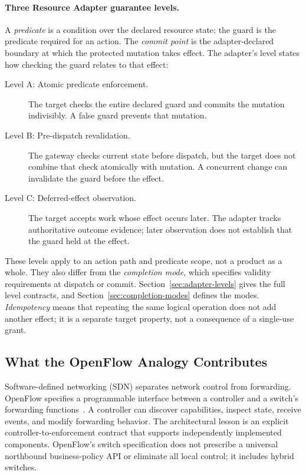 \paragraph{Three Resource Adapter guarantee levels.}
\label{sec:adapter-levels-overview}
A \emph{predicate} is a condition over the declared resource state; the guard is the predicate required for an action. The \emph{commit point} is the adapter-declared boundary at which the protected mutation takes effect. The adapter's level states how checking the guard relates to that effect:
\begin{description}
\item[Level A: Atomic predicate enforcement.] The target checks the entire declared guard and commits the mutation indivisibly. A false guard prevents that mutation.
\item[Level B: Pre-dispatch revalidation.] The gateway checks current state before dispatch, but the target does not combine that check atomically with mutation. A concurrent change can invalidate the guard before the effect.
\item[Level C: Deferred-effect observation.] The target accepts work whose effect occurs later. The adapter tracks authoritative outcome evidence; later observation does not establish that the guard held at the effect.
\end{description}
These levels apply to an action path and predicate scope, not a product as a whole. They also differ from the \emph{completion mode}, which specifies validity requirements at dispatch or commit. Section~\ref{sec:adapter-levels} gives the full level contracts, and Section~\ref{sec:completion-modes} defines the modes. \emph{Idempotency} means that repeating the same logical operation does not add another effect; it is a separate target property, not a consequence of a single-use grant.

\subsection{What the OpenFlow Analogy Contributes}
\label{sec:openflow-analogy}

Software-defined networking (SDN) separates network control from forwarding. OpenFlow specifies a programmable interface between a controller and a switch's forwarding functions~\cite{openflow151}. A controller can discover capabilities, inspect state, receive events, and modify forwarding behavior. The architectural lesson is an explicit controller-to-enforcement contract that supports independently implemented components. OpenFlow's switch specification does not prescribe a universal northbound business-policy API or eliminate all local control; it includes hybrid switches.

